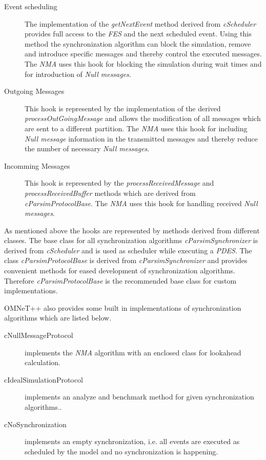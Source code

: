 \begin{description}
    \item[Event scheduling] The implementation of the \emph{getNextEvent} method derived from \emph{cScheduler} provides full access to the \emph{FES} and the next scheduled event.
    Using this method the synchronization algorithm can block the simulation, remove and introduce specific messages and thereby control the executed messages.
    The \emph{NMA} uses this hook for blocking the simulation during wait times and for introduction of \emph{Null messages}.
    \item[Outgoing Messages] This hook is represented by the implementation of the derived \emph{processOutGoingMessage} and allows the modification of all messages which are sent to a different partition.
    The \emph{NMA} uses this hook for including \emph{Null message} information in the transmitted messages and thereby reduce the number of necessary \emph{Null messages}.
    \item[Incomming Messages] This hook is represented by the \emph{processReceivedMessage} and \emph{processReceivedBuffer} methods which are derived from \emph{cParsimProtocolBase}.
    The \emph{NMA} uses this hook for handling received \emph{Null messages}.
\end{description}

As mentioned above the hooks are represented by methods derived from different classes.
The base class for all synchronization algorithms \emph{cParsimSynchronizer} is derived from \emph{cScheduler} and is used as scheduler while executing a \emph{PDES}.
The class \emph{cParsimProtocolBase} is derived from \emph{cParsimSynchronizer} and provides convenient methods for eased development of synchronization algorithms.
Therefore \emph{cParsimProtocolBase} is the recommended base class for custom implementations.

OMNeT++ also provides some built in implementations of synchronization algorithms which are listed below. \cite[section 16.3.5]{omnet_manual}

\begin{description}
    \item[cNullMessageProtocol] implements the \emph{NMA} algorithm with an enclosed class for lookahead calculation.
    \item[cIdealSimulationProtocol] implements an analyze and benchmark method for given synchronization algorithms.\cite[section 3]{bagrodia_performance_2000}.
    \item[cNoSynchronization] implements an empty synchronization, i.e. all events are executed as scheduled by the model and no synchronization is happening.
\end{description}

